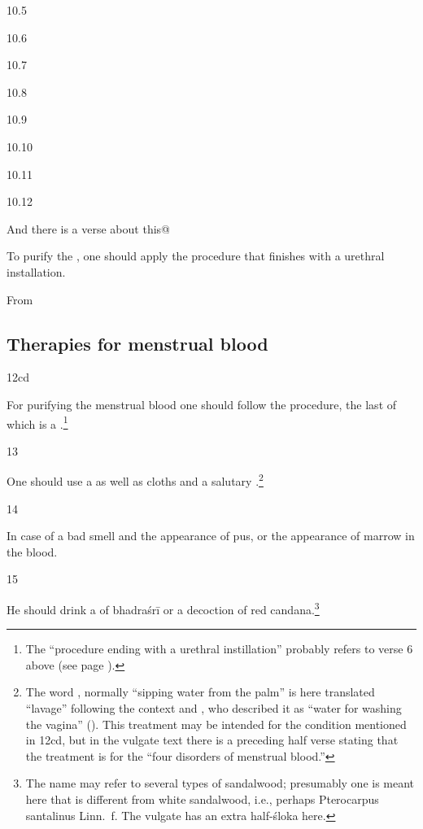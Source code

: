 \begin{translation}
\item[10.5]
\item[10.6]
\item[10.7]
\item[10.8]
\item[10.9]
\item[10.10]
\item[10.11]


\item[10.12]

And there is a verse about this@
\begin{sloka}
To purify the , one should apply the procedure 
that finishes with a urethral installation.    
    
\end{sloka}

From

\subsection{Therapies for menstrual blood}

\item [12cd]

For purifying the menstrual blood one should follow the procedure, the
last of which is a .\footnote{The
    “procedure ending with a urethral instillation” probably refers to verse
    6 above (see page \pageref{uttarabastyantam}).}
    
    
 \item[13]  
 
 One should use a  as well as cloths and a salutary
.\footnote{The word , normally
    “sipping water from the palm” is here translated “lavage” following the
    context and , who described it as “water for
    washing the vagina” ().  This treatment may be
    intended for the condition mentioned in 12cd, but in the vulgate text
    there is a preceding half verse stating that the treatment is for the
    “four disorders of menstrual blood.”}
    
\item[14]

In case of a bad smell and the appearance of pus, or the appearance of
marrow in the blood.
\item [15]

He should drink a  of \gls{bhadraśrī} or a decoction of 
red \gls{candana}.\footnote{The name  may refer to several 
types of sandalwood; presumably one is meant here that is different from 
white sandalwood, i.e., perhaps Pterocarpus santalinus Linn.\ f.  The vulgate 
has an extra half-śloka here.}
 

\end{translation}

